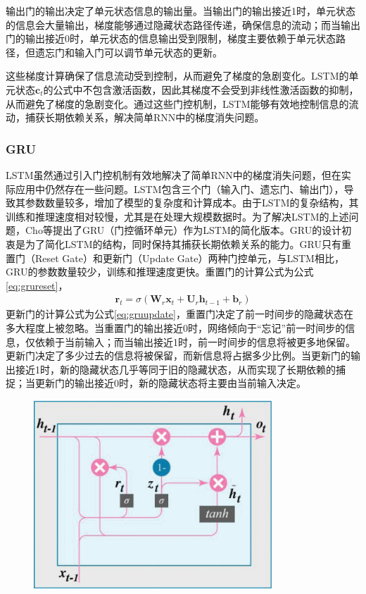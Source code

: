 输出门的输出决定了单元状态信息的输出量。当输出门的输出接近1时，单元状态的信息会大量输出，梯度能够通过隐藏状态路径传递，确保信息的流动；而当输出门的输出接近0时，单元状态的信息输出受到限制，梯度主要依赖于单元状态路径，但遗忘门和输入门可以调节单元状态的更新。

这些梯度计算确保了信息流动受到控制，从而避免了梯度的急剧变化。LSTM的单元状态$\mathbf{c}_t$的公式中不包含激活函数，因此其梯度不会受到非线性激活函数的抑制，从而避免了梯度的急剧变化。通过这些门控机制，LSTM能够有效地控制信息的流动，捕获长期依赖关系，解决简单RNN中的梯度消失问题。

\subsubsection{GRU}
LSTM虽然通过引入门控机制有效地解决了简单RNN中的梯度消失问题，但在实际应用中仍然存在一些问题。LSTM包含三个门（输入门、遗忘门、输出门），导致其参数数量较多，增加了模型的复杂度和计算成本。由于LSTM的复杂结构，其训练和推理速度相对较慢，尤其是在处理大规模数据时。为了解决LSTM的上述问题，Cho等提出了GRU（门控循环单元）作为LSTM的简化版本\cite{choLearningPhraseRepresentations2014}。GRU的设计初衷是为了简化LSTM的结构，同时保持其捕获长期依赖关系的能力。GRU只有重置门（Reset Gate）和更新门（Update Gate）两种门控单元，与LSTM相比，GRU的参数数量较少，训练和推理速度更快。重置门的计算公式为公式\eqref{eq:grureset}，
\begin{align}
  \mathbf{r}_t = \sigma(\mathbf{W}_r \mathbf{x}_t + \mathbf{U}_r \mathbf{h}_{t-1} + \mathbf{b}_r) \label{eq:grureset}
\end{align}
更新门的计算公式为公式\eqref{eq:gruupdate}，重置门决定了前一时间步的隐藏状态在多大程度上被忽略。当重置门的输出接近0时，网络倾向于“忘记”前一时间步的信息，仅依赖于当前输入；而当输出接近1时，前一时间步的信息将被更多地保留。
更新门决定了多少过去的信息将被保留，而新信息将占据多少比例。当更新门的输出接近1时，新的隐藏状态几乎等同于旧的隐藏状态，从而实现了长期依赖的捕捉；当更新门的输出接近0时，新的隐藏状态将主要由当前输入决定。
\begin{figure}[htbp]
  \centering
  \includegraphics[width=0.8\textwidth]{Fig/alela3-2927134-large.png}
\end{figure}
